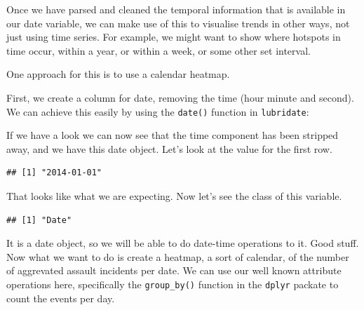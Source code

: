 \documentclass[
  krantz2]{krantz}
\makeatletter
\newenvironment{Shaded}{\begin{snugshade}}{\end{snugshade}}
\newcommand{\DecValTok}[1]{\textcolor[rgb]{0.06,0.06,0.06}{#1}}
\newcommand{\FunctionTok}[1]{\textcolor[rgb]{0,0,0}{#1}}
\newcommand{\NormalTok}[1]{#1}
\newcommand{\OtherTok}[1]{\textcolor[rgb]{0.37,0.37,0.37}{#1}}
\newcommand{\SpecialCharTok}[1]{\textcolor[rgb]{0,0,0}{#1}}
\newenvironment{kframe}{%
\medskip{}
\setlength{\fboxsep}{.8em}
 \def\at@end@of@kframe{}%
 \ifinner\ifhmode%
  \def\at@end@of@kframe{\end{minipage}}%
  \begin{minipage}{\columnwidth}%
 \fi\fi%
 \def\FrameCommand##1{\hskip\@totalleftmargin \hskip-\fboxsep
 \colorbox{shadecolor}{##1}\hskip-\fboxsep
     \hskip-\linewidth \hskip-\@totalleftmargin \hskip\columnwidth}%
 \MakeFramed {\advance\hsize-\width
   \@totalleftmargin\z@ \linewidth\hsize
   \@setminipage}}%
 {\par\unskip\endMakeFramed%
 \at@end@of@kframe}
\renewenvironment{Shaded}{\begin{kframe}}{\end{kframe}}
\makeatother
\begin{document}
Once we have parsed and cleaned the temporal information that is available in our date variable, we can make use of this to visualise trends in other ways, not just using time series. For example, we might want to show where hotspots in time occur, within a year, or within a week, or some other set interval.

One approach for this is to use a calendar heatmap.

First, we create a column for date, removing the time (hour minute and second). We can achieve this easily by using the \texttt{date()} function in \texttt{lubridate}:

\begin{Shaded}
\end{Shaded}

If we have a look we can now see that the time component has been stripped away, and we have this date object. Let's look at the value for the first row.

\begin{Shaded}
\end{Shaded}

\begin{verbatim}
## [1] "2014-01-01"
\end{verbatim}

That looks like what we are expecting. Now let's see the class of this variable.

\begin{Shaded}
\end{Shaded}

\begin{verbatim}
## [1] "Date"
\end{verbatim}

It is a date object, so we will be able to do date-time operations to it. Good stuff. Now what we want to do is create a heatmap, a sort of calendar, of the number of aggrevated assault incidents per date. We can use our well known attribute operations here, specifically the \texttt{group\_by()} function in the \texttt{dplyr} packate to count the events per day.
\end{document}
